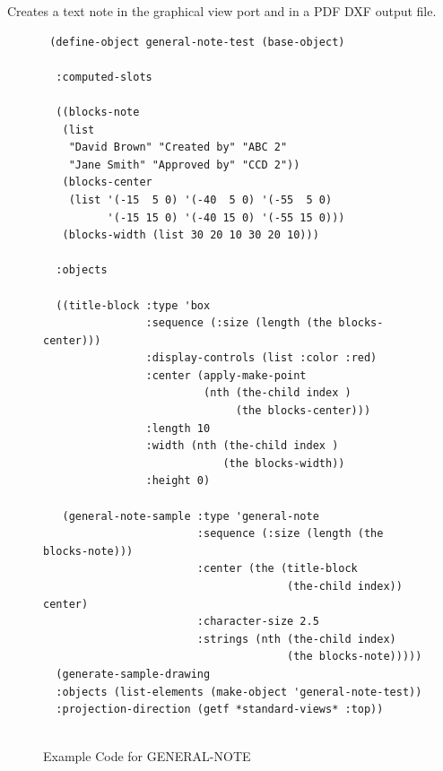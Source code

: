 \documentclass [11pt]{book}
\begin{document}
\begin{itemize}
\begin{description}
Creates a text note in the graphical view port and in a PDF DXF output file.



\end{description}




\begin{figure}
\begin{lrbox}{\boxedverb}
\begin{minipage}{\linewidth}
{\small

\begin{verbatim} 
 (define-object general-note-test (base-object)
  
  :computed-slots
  
  ((blocks-note 
   (list
    "David Brown" "Created by" "ABC 2"
    "Jane Smith" "Approved by" "CCD 2"))
   (blocks-center 
    (list '(-15  5 0) '(-40  5 0) '(-55  5 0)
          '(-15 15 0) '(-40 15 0) '(-55 15 0)))
   (blocks-width (list 30 20 10 30 20 10)))
  
  :objects 
  
  ((title-block :type 'box
                :sequence (:size (length (the blocks-center)))
                :display-controls (list :color :red)
                :center (apply-make-point 
                         (nth (the-child index ) 
                              (the blocks-center)))
                :length 10
                :width (nth (the-child index ) 
                            (the blocks-width))
                :height 0)

   (general-note-sample :type 'general-note
                        :sequence (:size (length (the blocks-note)))
                        :center (the (title-block 
                                      (the-child index)) center)
                        :character-size 2.5
                        :strings (nth (the-child index) 
                                      (the blocks-note)))))
  (generate-sample-drawing 
  :objects (list-elements (make-object 'general-note-test)) 
  :projection-direction (getf *standard-views* :top))


\end{verbatim}}
\end{minipage}
\end{lrbox}
\fbox{\usebox{\boxedverb}}

\caption{Example Code for GENERAL-NOTE}

\label{fig:example-code-GENERAL-NOTE}

\end{figure}


\end{itemize}
\end{document}
